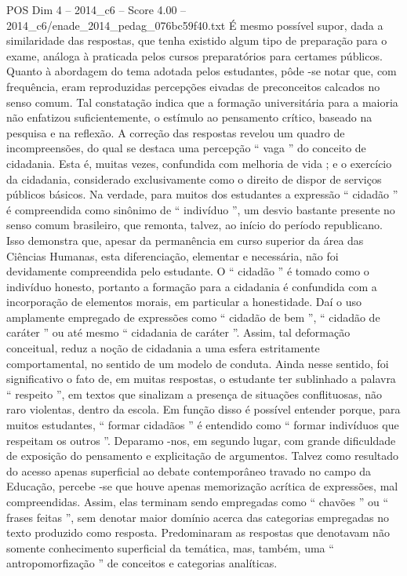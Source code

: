 \begin{textsample}{POS Dim 4 – 2014\_c6 – Score 4.00 – 2014\_c6/enade\_2014\_pedag\_076bc59f40.txt}
É mesmo possível supor, dada a similaridade das respostas, que tenha existido algum tipo de preparação para o exame, análoga à praticada pelos cursos preparatórios para certames públicos.
Quanto à abordagem do tema adotada pelos estudantes, pôde -se notar que, com frequência, eram reproduzidas percepções eivadas de preconceitos calcados no senso comum.
Tal constatação indica que a formação universitária para a maioria não enfatizou suficientemente, o estímulo ao pensamento crítico, baseado na pesquisa e na reflexão.
A correção das respostas revelou um quadro de incompreensões, do qual se destaca uma percepção “ vaga ” do conceito de cidadania.
Esta é, muitas vezes, confundida com melhoria de vida ; e o exercício da cidadania, considerado exclusivamente como o direito de dispor de serviços públicos básicos.
Na verdade, para muitos dos estudantes a expressão “ cidadão ” é compreendida como sinônimo de “ indivíduo ”, um desvio bastante presente no senso comum brasileiro, que remonta, talvez, ao início do período republicano.
Isso demonstra que, apesar da permanência em curso superior da área das Ciências Humanas, esta diferenciação, elementar e necessária, não foi devidamente compreendida pelo estudante.
O “ cidadão ” é tomado como o indivíduo honesto, portanto a formação para a cidadania é confundida com a incorporação de elementos morais, em particular a honestidade.
Daí o uso amplamente empregado de expressões como “ cidadão de bem ”, “ cidadão de caráter ” ou até mesmo “ cidadania de caráter ”.
Assim, tal deformação conceitual, reduz a noção de cidadania a uma esfera estritamente comportamental, no sentido de um modelo de conduta.
Ainda nesse sentido, foi significativo o fato de, em muitas respostas, o estudante ter sublinhado a palavra “ respeito ”, em textos que sinalizam a presença de situações conflituosas, não raro violentas, dentro da escola.
Em função disso é possível entender porque, para muitos estudantes, “ formar cidadãos ” é entendido como “ formar indivíduos que respeitam os outros ”.
Deparamo -nos, em segundo lugar, com grande dificuldade de exposição do pensamento e explicitação de argumentos.
Talvez como resultado do acesso apenas superficial ao debate contemporâneo travado no campo da Educação, percebe -se que houve apenas memorização acrítica de expressões, mal compreendidas.
Assim, elas terminam sendo empregadas como “ chavões ” ou “ frases feitas ”, sem denotar maior domínio acerca das categorias empregadas no texto produzido como resposta.
Predominaram as respostas que denotavam não somente conhecimento superficial da temática, mas, também, uma “ antropomorfização ” de conceitos e categorias analíticas.

\end{textsample}
